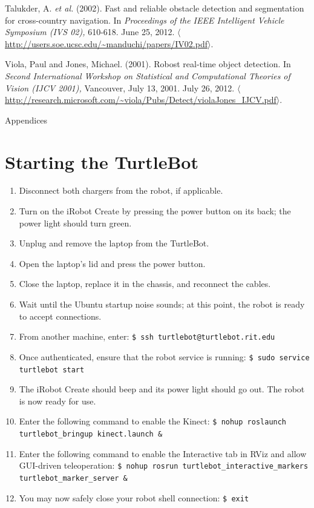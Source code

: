 \documentclass[12pt]{report}
\renewcommand{\Large}{\fontsize{18pt}{18pt}\selectfont}
\begin{document}
\label{bib:talukder}
Talukder, A. \textit{et al.} (2002). Fast and reliable obstacle detection and segmentation for cross-country navigation. In \textit{Proceedings of the IEEE Intelligent Vehicle Symposium (IVS 02),} 610-618. June 25, 2012. $\langle$\url{http://users.soe.ucsc.edu/~manduchi/papers/IV02.pdf}$\rangle$.

\label{bib:viola}
Viola, Paul and Jones, Michael. (2001). Robost real-time object detection. In \textit{Second International Workshop on Statistical and Computational Theories of Vision (IJCV 2001),} Vancouver, July 13, 2001. July 26, 2012. $\langle$\url{http://research.microsoft.com/~viola/Pubs/Detect/violaJones_IJCV.pdf}$\rangle$.

\clearpage
{\Large Appendices} \\
\appendix
\section{Starting the TurtleBot}
\begin{sloppypar}
\begin{enumerate}
\item{Disconnect both chargers from the robot, if applicable.}
\item{Turn on the iRobot Create by pressing the power button on its back; the power light should turn green.}
\item{Unplug and remove the laptop from the TurtleBot.}
\item{Open the laptop's lid and press the power button.}
\item{Close the laptop, replace it in the chassis, and reconnect the cables.}
\item{Wait until the Ubuntu startup noise sounds; at this point, the robot is ready to accept connections.}
\item{From another machine, enter: \texttt{\$\ ssh turtlebot@turtlebot.rit.edu}}
\item{Once authenticated, ensure that the robot service is running: \texttt{\$\ sudo service turtlebot start}}
\item{The iRobot Create should beep and its power light should go out.  The robot is now ready for use.}
\item{Enter the following command to enable the Kinect: \texttt{\$\ nohup roslaunch turtlebot\_bringup kinect.launch \&}}
\item{Enter the following command to enable the Interactive tab in RViz and allow GUI-driven teleoperation: \texttt{\$\ nohup rosrun turtlebot\_interactive\_markers turtlebot\_marker\_server \&}}
\item{You may now safely close your robot shell connection: \texttt{\$\ exit}}
\end{enumerate}
\end{sloppypar}
\end{document}
